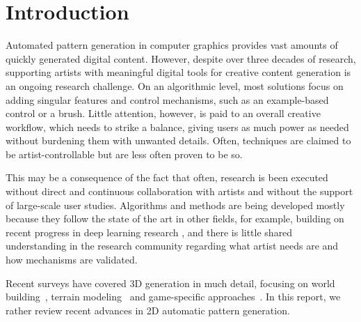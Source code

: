 \section{Introduction}
Automated pattern generation in computer graphics provides vast amounts of quickly generated digital content. However, despite over three decades of research, supporting artists with meaningful digital tools for creative content generation is an ongoing research challenge. On an algorithmic level, most solutions focus on adding singular features and control mechanisms, such as an example-based control or a brush. Little attention, however, is paid to an overall creative workflow, which needs to strike a balance, giving users as much power as needed without burdening them with unwanted details. Often, techniques are claimed to be artist-controllable but are less often proven to be so.

This may be a consequence of the fact that often, research is been executed without direct and continuous collaboration with artists and without the support of large-scale user studies. Algorithms and methods are being developed mostly because they follow the state of the art in other fields, for example, building on recent progress in deep learning research , and there is little shared understanding in the research community regarding what artist needs are and how mechanisms are validated.


Recent surveys have covered 3D generation in much detail, focusing on  world building~\cite{smelik_2014_aso, aliaga_2016_ipm}, terrain modeling~\cite{galin_2019_aro} and game-specific approaches~\cite{hendrikx_2013_pcg, togelius_2011_sbp}. In this report, we rather review recent advances in 2D automatic pattern generation.

